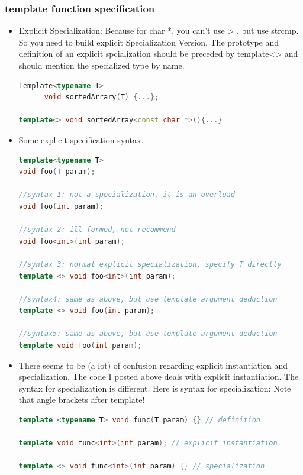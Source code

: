 \documentclass[a4paper,12pt,twoside]{book}
\begin{document}
\subsubsection{template function specification}
\begin{itemize}

\item Explicit Specialization: Because for char *, you can't use > , but use strcmp.  So you need to build explicit Specialization Version. The prototype and definition of an explicit spcialization should be preceded by template<> and should mention the specialized type by name.
\begin{lstlisting}[frame=single, language=c++]
Template<typename T>
      void sortedArrary(T) {...};

template<> void sortedArray<const char *>(){...}
\end{lstlisting}

\item Some explicit specification syntax.
\begin{lstlisting}[frame=single, language=c++]
template<typename T>
void foo(T param);

//syntax 1: not a specialization, it is an overload
void foo(int param);

//syntax 2: ill-formed, not recommend
void foo<int>(int param);

//syntax 3: normal explicit specialization, specify T directly
template <> void foo<int>(int param);

//syntax4: same as above, but use template argument deduction
template <> void foo(int param);

//syntax5: same as above, but use template argument deduction
template void foo(int param);
\end{lstlisting}

\item There seems to be (a lot) of confusion regarding explicit instantiation and specialization. The code I posted above deals with explicit instantiation. The syntax for specialization is different. Here is syntax for specialization: Note that angle brackets after template!

\begin{lstlisting}[frame=single, language=c++]
template <typename T> void func(T param) {} // definition

template void func<int>(int param); // explicit instantiation.

template <> void func<int>(int param) {} // specialization
\end{lstlisting}


\end{itemize}
\end{document}
